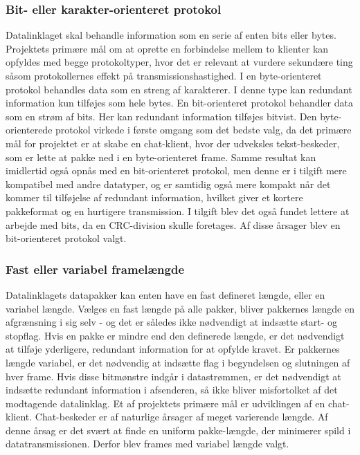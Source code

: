 \subsubsection{Bit- eller karakter-orienteret protokol}
Datalinklaget skal behandle information som en serie af enten bits eller bytes. Projektets primære mål om at oprette en forbindelse mellem to klienter kan opfyldes med begge protokoltyper, hvor det er relevant at vurdere sekundære ting såsom protokollernes effekt på transmissionshastighed.
I en byte-orienteret protokol behandles data som en streng af karakterer. I denne type kan redundant information kun tilføjes som hele bytes.
En bit-orienteret protokol behandler data som en strøm af bits. Her kan redundant information tilføjes bitvist. 
    Den byte-orienterede protokol virkede i første omgang som det bedste valg, da det primære mål for projektet er at skabe en chat-klient, hvor der udveksles tekst-beskeder, som er lette at pakke ned i en byte-orienteret frame. Samme resultat kan imidlertid også opnås med en bit-orienteret protokol, men denne er i tilgift mere kompatibel med andre datatyper, og er samtidig også mere kompakt når det kommer til tilføjelse af redundant information, hvilket giver et kortere pakkeformat og en hurtigere transmission. I tilgift blev det også fundet lettere at arbejde med bits, da en CRC-division skulle foretages. Af disse årsager blev en bit-orienteret protokol valgt.

\subsubsection{Fast eller variabel framelængde}
Datalinklagets datapakker kan enten have en fast defineret længde, eller en variabel længde.
Vælges en fast længde på alle pakker, bliver pakkernes længde en afgrænsning i sig selv - og det er således ikke nødvendigt at indsætte start- og stopflag. Hvis en pakke er mindre end den definerede længde, er det nødvendigt at tilføje yderligere, redundant information for at opfylde kravet.
Er pakkernes længde variabel, er det nødvendig at indsætte flag i begyndelsen og slutningen af hver frame. Hvis disse bitmønstre indgår i datastrømmen, er det nødvendigt at indsætte redundant information i afsenderen, så ikke bliver misfortolket af det modtagende datalinklag.
Et af projektets primære mål er udviklingen af en chat-klient. Chat-beskeder er af naturlige årsager af meget varierende længde. Af denne årsag er det svært at finde en uniform pakke-længde, der minimerer spild i datatransmissionen. Derfor blev frames med variabel længde valgt.

